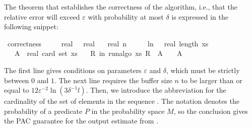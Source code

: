 \documentclass[a4paper,UKenglish,cleveref, autoref, thm-restate]{lipics-v2021}
\newcommand{\isaprob}[3]{\isa{\isasymP{\isacharparenleft}#1 \isatext{in} #2{\isachardot} #3\isacharparenright}}
\newenvironment{isabelle_cm}{\begin{mdframed}[backgroundcolor=shadecolor,nobreak=true,linewidth=0]\begin{isabelle}}{\end{isabelle}\end{mdframed}}%
\begin{document}
The theorem that establishes the correctness of the algorithm, i.e., that the relative error will exceed $\varepsilon$ with probability at most $\delta$ is expressed in the following snippet:
\begin{isabelle_cm}
\isamarkupfalse%
\ correctness{\isacharcolon}{\kern0pt}\isanewline
\ \ \ {\isacartoucheopen}{\isasymepsilon}\ {\isasymin}\ {\isacharbraceleft}{\kern0pt}{}{\isacharless}{\kern0pt}{\isachardot}{\kern0pt}{\isachardot}{\kern0pt}{\isacharless}{\kern0pt}{}{\isacharcolon}{\kern0pt}{\isacharcolon}{\kern0pt}real{\isacharbraceright}{\kern0pt}{\isacartoucheclose}\ {\isacartoucheopen}{\isasymdelta}\ {\isasymin}\ {\isacharbraceleft}{\kern0pt}{}{\isacharless}{\kern0pt}{\isachardot}{\kern0pt}{\isachardot}{\kern0pt}{\isacharless}{\kern0pt}{}{\isacharcolon}{\kern0pt}{\isacharcolon}{\kern0pt}real{\isacharbraceright}{\kern0pt}{\isacartoucheclose}\isanewline
\ \ \ {\isacartoucheopen}real\ n\ {\isasymge}\ {}{}\ {\isacharslash}{\kern0pt}\ {\isasymepsilon}\ {\isacharasterisk}{\kern0pt}\ ln\ {\isacharparenleft}{\kern0pt}{}\ {\isacharasterisk}{\kern0pt}\ real\ {\isacharparenleft}{\kern0pt}length\ xs{\isacharparenright}{\kern0pt}\ {\isacharslash}{\kern0pt}\ {\isasymdelta}{\isacharparenright}{\kern0pt}{\isacartoucheclose}\isanewline
\ \ \ {\isacartoucheopen}A\ {\isasymequiv}\ real\ {\isacharparenleft}{\kern0pt}card\ {\isacharparenleft}{\kern0pt}set\ xs{\isacharparenright}{\kern0pt}{\isacharparenright}{\kern0pt}{\isacartoucheclose}\isanewline
\ \ \ {\isacartoucheopen}{\isasymP}{\isacharparenleft}{\kern0pt}R\ in\ run{\isacharunderscore}{\kern0pt}algo\ xs{\isachardot}{\kern0pt}\ {\isasymbar}R\ {\isacharminus}{\kern0pt}\ A{\isasymbar}\ {\isachargreater}{\kern0pt}\ {\isasymepsilon}\ {\isacharasterisk}{\kern0pt}\ A{\isacharparenright}{\kern0pt}\ {\isasymle}\ {\isasymdelta}{\isacartoucheclose}
\end{isabelle_cm}
The first line gives conditions on parameters $\varepsilon$ and $\delta$, which must be strictly between $0$ and $1$.
The next line requires the buffer size $n$ to be larger than or equal to $12 \varepsilon^{-2} \ln ( 3 \delta^{-1} l)$.
Then, we introduce the abbreviation  for the cardinality of the set of elements in the sequence .
The notation \isaprob{x}{M}{P x} denotes the probability of a predicate $P$ in the probability space $M$, so the conclusion gives the PAC guarantee for the output estimate  from .
\end{document}
